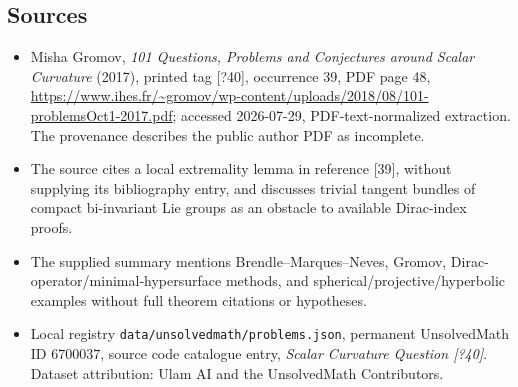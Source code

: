 \documentclass[11pt]{article}
\begin{document}
\subsection{Sources}
\begin{itemize}
\item Misha Gromov, \emph{101 Questions, Problems and Conjectures around Scalar Curvature} (2017), printed tag [?40], occurrence 39, PDF page 48, \url{https://www.ihes.fr/~gromov/wp-content/uploads/2018/08/101-problemsOct1-2017.pdf}; accessed 2026-07-29, PDF-text-normalized extraction. The provenance describes the public author PDF as incomplete.
\item The source cites a local extremality lemma in reference [39], without supplying its bibliography entry, and discusses trivial tangent bundles of compact bi-invariant Lie groups as an obstacle to available Dirac-index proofs.
\item The supplied summary mentions Brendle--Marques--Neves, Gromov, Dirac-operator/minimal-hypersurface methods, and spherical/projective/hyperbolic examples without full theorem citations or hypotheses.
\item Local registry \texttt{data/unsolvedmath/problems.json}, permanent UnsolvedMath ID $6700037$, source code catalogue entry, \emph{Scalar Curvature Question [?40]}. Dataset attribution: Ulam AI and the UnsolvedMath Contributors.
\end{itemize}
\end{document}
